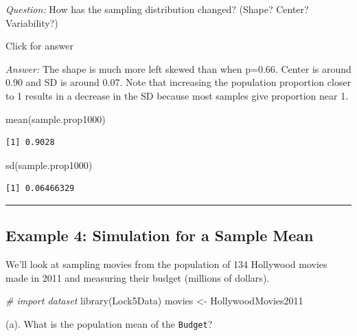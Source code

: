 \documentclass[
]{book}
\newenvironment{Shaded}{\begin{snugshade}}{\end{snugshade}}
\newcommand{\CommentTok}[1]{\textcolor[rgb]{0.56,0.35,0.01}{\textit{#1}}}
\newcommand{\FunctionTok}[1]{\textcolor[rgb]{0.00,0.00,0.00}{#1}}
\newcommand{\NormalTok}[1]{#1}
\newcommand{\OtherTok}[1]{\textcolor[rgb]{0.56,0.35,0.01}{#1}}
\begin{document}
\emph{Question:} How has the sampling distribution changed? (Shape? Center? Variability?)

Click for answer

\emph{Answer:} The shape is much more left skewed than when p=0.66. Center is around 0.90 and SD is around 0.07. Note that increasing the population proportion closer to 1 results in a decrease in the SD because most samples give proportion near 1.

\begin{Shaded}
\begin{Highlighting}[]
\FunctionTok{mean}\NormalTok{(sample.prop1000)}
\end{Highlighting}
\end{Shaded}

\begin{verbatim}
[1] 0.9028
\end{verbatim}

\begin{Shaded}
\begin{Highlighting}[]
\FunctionTok{sd}\NormalTok{(sample.prop1000)}
\end{Highlighting}
\end{Shaded}

\begin{verbatim}
[1] 0.06466329
\end{verbatim}

\begin{center}\rule{0.5\linewidth}{0.5pt}\end{center}

\hypertarget{example-4-simulation-for-a-sample-mean}{%
\subsection{Example 4: Simulation for a Sample Mean}\label{example-4-simulation-for-a-sample-mean}}

We'll look at sampling movies from the population of 134 Hollywood movies made in 2011 and measuring their budget (millions of dollars).

\begin{Shaded}
\begin{Highlighting}[]
\CommentTok{\# import dataset}
\FunctionTok{library}\NormalTok{(Lock5Data)}
\NormalTok{movies }\OtherTok{\textless{}{-}}\NormalTok{ HollywoodMovies2011}
\end{Highlighting}
\end{Shaded}

(a). What is the population mean of the \texttt{Budget}?
\end{document}

